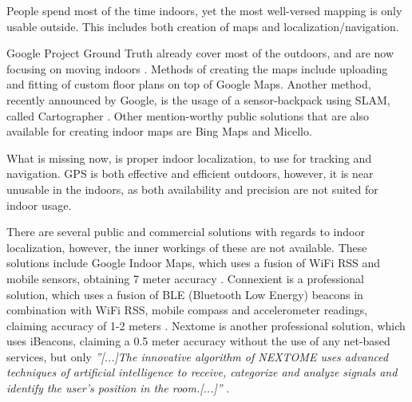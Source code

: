 
People spend most of the time indoors, yet the most well-versed mapping is only usable outside.
This includes both creation of maps and localization/navigation.

Google Project Ground Truth\cite{googleio_ground_truth} already cover most of the outdoors, and are now focusing on moving indoors \cite{googleio_indoor_maps}\cite{indoor_maps_google_slides}.
Methods of creating the maps include uploading and fitting of custom floor plans on top of Google Maps.
Another method, recently announced by Google, is the usage of a sensor-backpack using SLAM, called Cartographer \cite{cartographer}.
Other mention-worthy public solutions that are also available for creating indoor maps are Bing Maps\cite{bingmaps} and Micello\cite{micello}.

What is missing now, is proper indoor localization, to use for tracking and navigation.
GPS is both effective and efficient outdoors, however, it is near unusable in the indoors, as both availability and precision are not suited for indoor usage.

There are several public and commercial solutions with regards to indoor localization, however, the inner workings of these are not available.
These solutions include Google Indoor Maps, which uses a fusion of WiFi RSS and mobile sensors, obtaining 7 meter accuracy \cite{googleio_indoor_maps}.
Connexient is a professional solution, which uses a fusion of BLE (Bluetooth Low Energy) beacons in combination with WiFi RSS, mobile compass and accelerometer readings, claiming accuracy of 1-2 meters \cite{connexient_indoor_pos}.
Nextome is another professional solution, which uses iBeacons\cite{ibeacon}, claiming a 0.5 meter accuracy without the use of any net-based services, but only \textit{''[...]The innovative algorithm of NEXTOME uses advanced techniques of artificial intelligence to receive, categorize and analyze signals and identify the user’s position in the room.[...]''} \cite{nextome_indoor_pos}.

